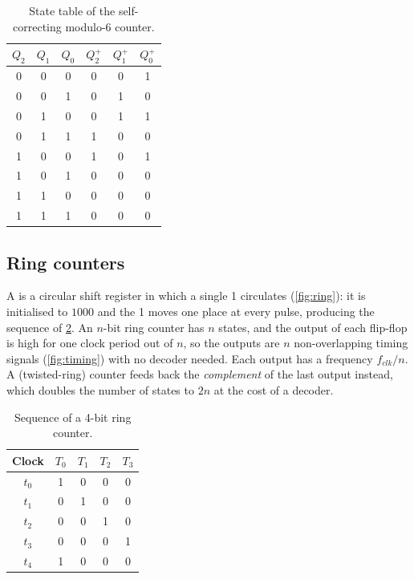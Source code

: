 \begin{table}[htbp]
\centering
\caption{State table of the self-correcting modulo-6 counter.}
\label{tab:selfcorr}
\begin{tabular}{ccc|ccc}
\toprule
$Q_2$&$Q_1$&$Q_0$&$Q_2^+$&$Q_1^+$&$Q_0^+$\\ \midrule
0&0&0&0&0&1\\0&0&1&0&1&0\\0&1&0&0&1&1\\0&1&1&1&0&0\\1&0&0&1&0&1\\1&0&1&0&0&0\\ \midrule
1&1&0&0&0&0\\1&1&1&0&0&0\\ \bottomrule
\end{tabular}
\end{table}


\subsection{Ring counters}
A  is a circular shift register in which a single 1 circulates (\cref{fig:ring}): it is initialised to $1000$ and the 1 moves one place at every pulse, producing the sequence of \cref{tab:ring}. An $n$-bit ring counter has $n$ states, and the output of each flip-flop is high for one clock period out of $n$, so the outputs are $n$ non-overlapping timing signals (\cref{fig:timing}) with no decoder needed. Each output has a frequency $f_{clk}/n$. A  (twisted-ring) counter feeds back the \emph{complement} of the last output instead, which doubles the number of states to $2n$ at the cost of a decoder.

\begin{table}[htbp]
\centering
\caption{Sequence of a 4-bit ring counter.}
\label{tab:ring}
\begin{tabular}{c|cccc}
\toprule Clock & $T_0$&$T_1$&$T_2$&$T_3$\\ \midrule
$t_0$&1&0&0&0\\$t_1$&0&1&0&0\\$t_2$&0&0&1&0\\$t_3$&0&0&0&1\\$t_4$&1&0&0&0\\ \bottomrule
\end{tabular}
\end{table}

